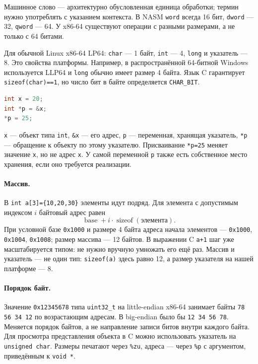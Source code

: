 Машинное слово --- архитектурно обусловленная единица обработки; термин
нужно употреблять с указанием контекста. В NASM \texttt{word} всегда
16 бит, \texttt{dword} --- 32, \texttt{qword} --- 64. У x86-64 существуют
операции с разными размерами, а не только с 64 битами.

Для обычной Linux x86-64 LP64: \texttt{char} --- 1 байт, \texttt{int} --- 4,
\texttt{long} и указатель --- 8. Это свойства платформы. Например,
в распространённой 64-битной Windows используется LLP64 и \texttt{long}
обычно имеет размер 4 байта. Язык C гарантирует \texttt{sizeof(char)==1},
но число бит в байте определяется \texttt{CHAR\_BIT}.

\begin{lstlisting}[language=C,basicstyle=\ttfamily\small]
int x = 20;
int *p = &x;
*p = 25;
\end{lstlisting}
\texttt{x} --- объект типа \texttt{int}, \texttt{\&x} --- его адрес,
\texttt{p} --- переменная, хранящая указатель, \texttt{*p} --- обращение
к объекту по этому указателю. Присваивание \texttt{*p=25} меняет значение
\texttt{x}, но не адрес \texttt{x}. У самой переменной \texttt{p} также
есть собственное место хранения, если оно требуется реализации.

\paragraph{Массив.}
В \texttt{int a[3]=\{10,20,30\}} элементы идут подряд. Для элемента
с допустимым индексом $i$ байтовый адрес равен
\[
\operatorname{base}+i\cdot\operatorname{sizeof}(\text{элемента}).
\]
При условной базе \texttt{0x1000} и размере 4 байта адреса начала элементов
--- \texttt{0x1000}, \texttt{0x1004}, \texttt{0x1008}; размер массива ---
12 байтов. В выражении C \texttt{a+1} шаг уже масштабируется типом:
не нужно вручную умножать его ещё раз. Массив и указатель --- не один тип:
\texttt{sizeof(a)} здесь равно 12, а размер указателя на нашей платформе --- 8.

\paragraph{Порядок байт.}
Значение \texttt{0x12345678} типа \texttt{uint32\_t} на little-endian x86-64
занимает байты \texttt{78 56 34 12} по возрастающим адресам.
В big-endian было бы \texttt{12 34 56 78}. Меняется порядок байтов,
а не направление записи битов внутри каждого байта.
Для просмотра представления объекта в C можно использовать указатель
на \texttt{unsigned char}. Размеры печатают через \texttt{\%zu}, адреса ---
через \texttt{\%p} с аргументом, приведённым к \texttt{void *}.

